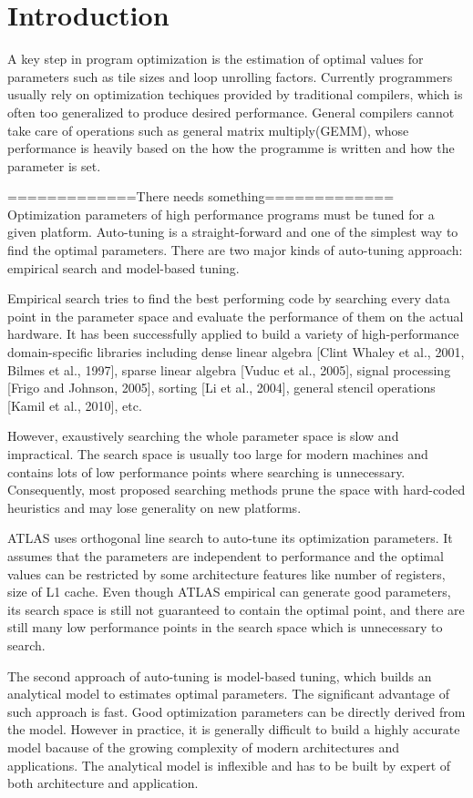 \section{Introduction}
\label{sec:intro}

A key step in program optimization is the estimation of optimal values for
parameters such as tile sizes and loop unrolling factors. Currently programmers
usually rely on optimization techiques provided by traditional compilers, which
is often too generalized to produce desired performance. General compilers
cannot take care of operations such as general matrix multiply(GEMM), whose
performance is heavily based on the how the programme is written and how the
parameter is set.
\par
=============There needs something=============
Optimization parameters of high performance programs must be tuned for a given platform. 
Auto-tuning is a straight-forward and one of the simplest way to find the optimal parameters.
There are two major kinds of auto-tuning approach: empirical search and model-based tuning. 
\par
Empirical search tries to find the best performing code by searching every data point in 
the parameter space and evaluate the performance of them on the actual hardware.
It has been successfully applied to build a variety
of high-performance domain-specific libraries including
dense linear algebra [Clint Whaley et al., 2001, Bilmes et al.,
1997], sparse linear algebra [Vuduc et al., 2005], signal processing
[Frigo and Johnson, 2005], sorting [Li et al., 2004],
general stencil operations [Kamil et al., 2010], etc.
\par
However, exaustively searching the whole parameter space is slow and impractical. 
The search space is usually too large for modern machines and contains lots of low performance points where
searching is unnecessary. Consequently, most proposed searching methods
prune the space with hard-coded heuristics and may lose generality on new platforms.
\par
ATLAS uses orthogonal line search to auto-tune its optimization parameters. 
It assumes that the parameters are independent to performance and the optimal values can be 
restricted by some architecture features like number of registers, size of L1 cache. 
Even though ATLAS empirical can generate good parameters, its search space is still not guaranteed to contain 
the optimal point, and there are still many low performance points in the search space which is unnecessary 
to search.
\par
The second approach of auto-tuning is model-based tuning, which builds an analytical model
to estimates optimal parameters. The significant advantage of such approach is fast. Good optimization
parameters can be directly derived from the model. 
However in practice, it is generally difficult to build a highly accurate model bacause of the growing complexity
of modern architectures and applications. The analytical model is inflexible and has to be built by expert of both architecture
and application.

